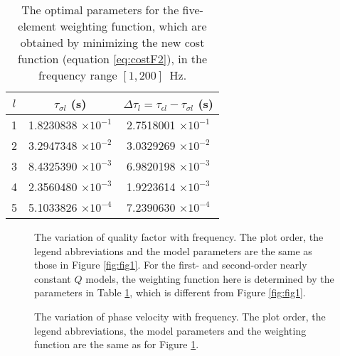 \documentclass[article]{./macros/elsarticle_qh}
\begin{document}
\begin{table}[ht!]
\centering
\caption{The optimal parameters for the five-element weighting function, which are obtained by minimizing the new cost function (equation \ref{eq:costF2}), in the frequency range $[1,200]$~Hz.}
\label{tab:tabl11}
\begin{tabular}{c c c}
\toprule
$l$ & $\tau_{\sigma l}$ (s) & $\Delta \tau_{l} = \tau_{\epsilon l}-\tau_{\sigma l}$ (s) \\
\midrule
1 &	1.8230838 $\times 10^{-1}$ & 2.7518001 $\times 10^{-1}$ \\
2 &	3.2947348 $\times 10^{-2}$ & 3.0329269 $\times 10^{-2}$ \\
3 &	8.4325390 $\times 10^{-3}$ & 6.9820198 $\times 10^{-3}$ \\
4 &	2.3560480 $\times 10^{-3}$ & 1.9223614 $\times 10^{-3}$ \\
5 &	5.1033826 $\times 10^{-4}$ & 7.2390630 $\times 10^{-4}$ \\
\bottomrule   
\end{tabular}
\end{table}

\begin{figure}[H]
\centering
{}
\caption{
The variation of quality factor with frequency. The plot order, the legend abbreviations and the model parameters are the same as those in Figure \ref{fig:fig1}.  
For the first- and second-order nearly constant $Q$ models, the weighting function here is determined by the parameters in Table \ref{tab:tabl11}, which is different from Figure \ref{fig:fig1}. 
}
\label{fig:fig15}
\end{figure}

\begin{figure}[H]
\centering
{}
\caption{
The variation of phase velocity with frequency. The plot order, the legend abbreviations, the model parameters and the weighting function are the same as for Figure \ref{fig:fig15}.
}
\label{fig:fig16}
\end{figure}
\end{document}
